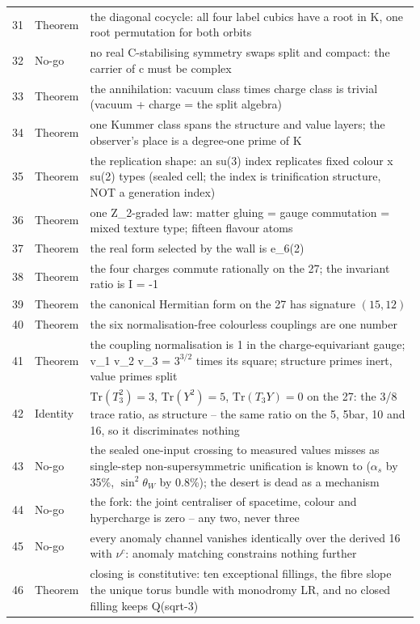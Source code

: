 \documentclass[11pt,a4paper]{article}
\theoremstyle{definition}
\theoremstyle{remark}
\begin{document}
\begin{longtable}{@{}r l p{8.2cm}@{}}
31 & Theorem & the diagonal cocycle: all four label cubics have a root in K, one root permutation for both orbits \\
32 & No-go & no real C-stabilising symmetry swaps split and compact: the carrier of c must be complex \\
33 & Theorem & the annihilation: vacuum class times charge class is trivial (vacuum + charge = the split algebra) \\
34 & Theorem & one Kummer class spans the structure and value layers; the observer's place is a degree-one prime of K \\
35 & Theorem & the replication shape: an su(3) index replicates fixed colour x su(2) types (sealed cell; the index is trinification structure, NOT a generation index) \\
36 & Theorem & one Z\_2-graded law: matter gluing = gauge commutation = mixed texture type; fifteen flavour atoms \\
37 & Theorem & the real form selected by the wall is e\_6(2) \\
38 & Theorem & the four charges commute rationally on the 27; the invariant ratio is I = -1 \\
39 & Theorem & the canonical Hermitian form on the 27 has signature $(15,12)$ \\
40 & Theorem & the six normalisation-free colourless couplings are one number \\
41 & Theorem & the coupling normalisation is 1 in the charge-equivariant gauge; v\_1 v\_2 v\_3 = $3^{3/2}$ times its square; structure primes inert, value primes split \\
42 & Identity & $\mathrm{Tr}(T_3^2) = 3$, $\mathrm{Tr}(Y^2) = 5$, $\mathrm{Tr}(T_3 Y) = 0$ on the 27: the 3/8 trace ratio, as structure -- the same ratio on the 5, 5bar, 10 and 16, so it discriminates nothing \\
43 & No-go & the sealed one-input crossing to measured values misses as single-step non-supersymmetric unification is known to ($\alpha_s$ by 35\%, $\sin^2\theta_W$ by 0.8\%); the desert is dead as a mechanism \\
44 & No-go & the fork: the joint centraliser of spacetime, colour and hypercharge is zero -- any two, never three \\
45 & No-go & every anomaly channel vanishes identically over the derived 16 with $\nu^c$: anomaly matching constrains nothing further \\
46 & Theorem & closing is constitutive: ten exceptional fillings, the fibre slope the unique torus bundle with monodromy LR, and no closed filling keeps Q(sqrt-3) \\

\end{longtable}
\end{document}
